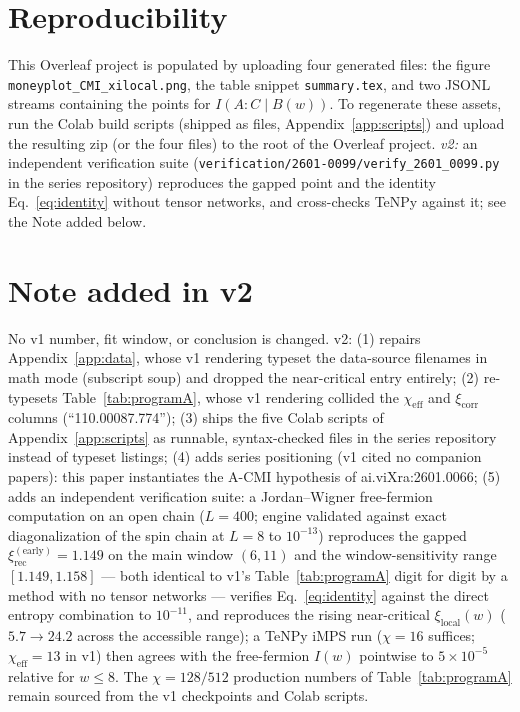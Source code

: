 \documentclass[11pt]{article}
\begin{document}
\section{Reproducibility}

This Overleaf project is populated by uploading four generated files:
the figure \texttt{moneyplot\_CMI\_xilocal.png}, the table snippet
\texttt{summary.tex}, and two JSONL streams containing the points for
$I(A : C \mid B(w))$. To regenerate these assets, run the Colab build
scripts (shipped as files, Appendix~\ref{app:scripts}) and upload the
resulting zip (or the four files) to the root of the Overleaf project.
\emph{v2:} an independent verification suite
(\texttt{verification/2601-0099/verify\_2601\_0099.py} in the series
repository) reproduces the gapped point and the identity
Eq.~\eqref{eq:identity} without tensor networks, and cross-checks TeNPy
against it; see the Note added below.

\section*{Note added in v2}
No v1 number, fit window, or conclusion is changed. v2: (1) repairs
Appendix~\ref{app:data}, whose v1 rendering typeset the data-source
filenames in math mode (subscript soup) and dropped the near-critical
entry entirely; (2) re-typesets Table~\ref{tab:programA}, whose v1
rendering collided the $\chi_{\mathrm{eff}}$ and $\xi_{\mathrm{corr}}$
columns (``110.00087.774''); (3) ships the five Colab scripts of
Appendix~\ref{app:scripts} as runnable, syntax-checked files in the
series repository instead of typeset listings; (4) adds series
positioning (v1 cited no companion papers): this paper instantiates the
A-CMI hypothesis of ai.viXra:2601.0066; (5) adds an independent
verification suite: a Jordan--Wigner free-fermion computation on an open
chain ($L = 400$; engine validated against exact diagonalization of the
spin chain at $L = 8$ to $10^{-13}$) reproduces the gapped
$\xi_{\mathrm{rec}}^{(\mathrm{early})} = 1.149$ on the main window
$(6,11)$ and the window-sensitivity range $[1.149, 1.158]$ --- both
identical to v1's Table~\ref{tab:programA} digit for digit by a method
with no tensor networks --- verifies Eq.~\eqref{eq:identity} against the
direct entropy combination to $10^{-11}$, and reproduces the rising
near-critical $\xi_{\mathrm{local}}(w)$ ($5.7 \to 24.2$ across the
accessible range); a TeNPy iMPS run ($\chi = 16$ suffices;
$\chi_{\mathrm{eff}} = 13$ in v1) then agrees with the free-fermion
$I(w)$ pointwise to $5\times10^{-5}$ relative for $w \le 8$. The
$\chi = 128/512$ production numbers of Table~\ref{tab:programA} remain
sourced from the v1 checkpoints and Colab scripts.
\end{document}
